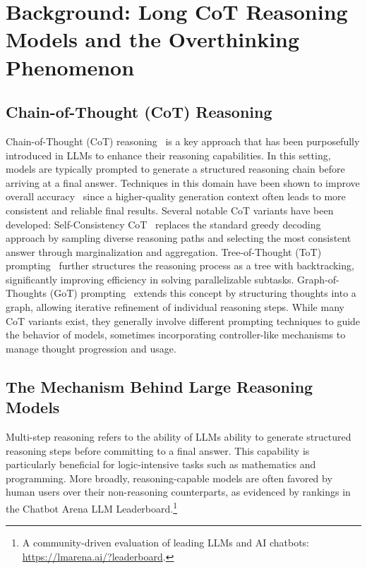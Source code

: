 \section{Background: Long CoT Reasoning Models and the Overthinking Phenomenon}

\subsection{Chain-of-Thought (CoT) Reasoning}

Chain-of-Thought (CoT) reasoning~\cite{wei2022chain} is a key approach that has been purposefully introduced in LLMs to enhance their reasoning capabilities. In this setting, models are typically prompted to generate a structured reasoning chain before arriving at a final answer. Techniques in this domain have been shown to improve overall accuracy~\cite{wei2022chain} since a higher-quality generation context often leads to more consistent and reliable final results. Several notable CoT variants have been developed: Self-Consistency CoT~\cite{wang2023self} replaces the standard greedy decoding approach by sampling diverse reasoning paths and selecting the most consistent answer through marginalization and aggregation. Tree-of-Thought (ToT) prompting~\cite{yao2023tree} further structures the reasoning process as a tree with backtracking, significantly improving efficiency in solving parallelizable subtasks. Graph-of-Thoughts (GoT) prompting~\cite{besta2024graph} extends this concept by structuring thoughts into a graph, allowing iterative refinement of individual reasoning steps. While many CoT variants exist, they generally involve different prompting techniques to guide the behavior of models, sometimes incorporating controller-like mechanisms to manage thought progression and usage.

\subsection{The Mechanism Behind Large Reasoning Models}

Multi-step reasoning refers to the ability of LLMs ability to generate structured reasoning steps before committing to a final answer. This capability is particularly beneficial for logic-intensive tasks such as mathematics and programming. More broadly, reasoning-capable models are often favored by human users over their non-reasoning counterparts, as evidenced by rankings in the Chatbot Arena LLM Leaderboard.\footnote{A community-driven evaluation of leading LLMs and AI chatbots: \url{https://lmarena.ai/?leaderboard}.}

